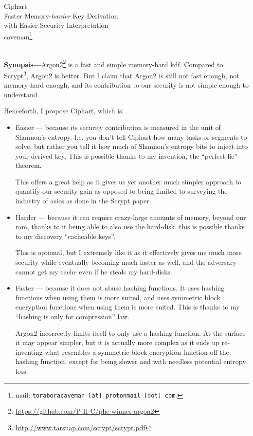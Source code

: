 \documentclass[twocolumn]{article}
\begin{document}
\SetInd{.15em}{1em}

\begin{center}
\Huge
Ciphart\\
\Large
Faster Memory-\emph{harder} Key Derivation \\
with Easier Security Interpretation\\
\normalsize
caveman\footnote{mail: \texttt{toraboracaveman [at] protonmail [dot]
com}.}\\
\footnotesize
\DTMnow\\
\end{center}

\noindent\textbf{Synopsis---}Argon2\footnote{\url{https://github.com/P-H-C/phc-winner-argon2}}
is a fast and simple memory-hard \gls{kdf}.  Compared to
Scrypt\footnote{\url{http://www.tarsnap.com/scrypt/scrypt.pdf}}, Argon2 is
better.  But I claim that Argon2 is still not fast enough, not memory-hard
enough, and its contribution to our security is not simple enough to
understand.

Henceforth, I propose Ciphart, which is:
\begin{itemize}
    \item Easier --- because its security contribution is measured in the
    unit of Shannon's entropy.  I.e. you don't tell Ciphart how many
    tasks or segments to solve, but rather you tell it how much of
    Shannon's entropy bits to inject into your derived key.  This is
    possible thanks to my invention, the ``perfect lie'' theorem.

    This offers a great help as it gives us yet another much simpler
    approach to quantify our security gain as opposed to being limited to
    surveying the industry of \glspl{asic} as done in the Scrypt paper.

    \item Harder --- because it can require crazy-large amounts of memory,
    beyond our \gls{ram}, thanks to it being able to also use
    the hard-disk.  this is possible thanks to my discovery ``cacheable
    keys''.

    This is optional, but I extremely like it as it effectively gives me
    much more security while eventually becoming much faster as well, and
    the adversary cannot get my cache even if he steals my hard-disks.

    \item Faster --- because it does not abuse hashing functions.  It uses
    hashing functions when using them is more suited, and uses symmetric
    block encryption functions when using them is  more suited.  This is
    thanks to my ``hashing is only for compression'' law.

    Argon2 incorrectly limits itself to only use a hashing function.
    At the surface it may appear simpler, but it is actually more complex
    as it ends up re-inventing what resembles a symmetric block encryption
    function off the hashing function, except for being slower and with
    needless potential entropy loss.
\end{itemize}
\end{document}
